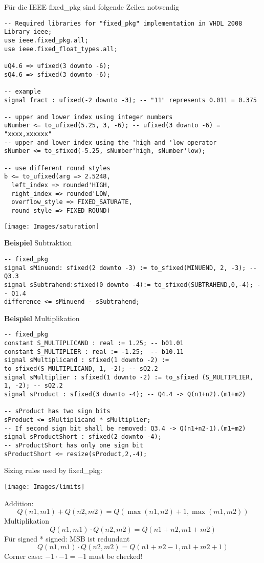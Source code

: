 Für die IEEE fixed\_pkg sind folgende Zeilen notwendig
\begin{lstlisting}
-- Required libraries for "fixed_pkg" implementation in VHDL 2008
Library ieee;
use ieee.fixed_pkg.all;
use ieee.fixed_float_types.all;

uQ4.6 => ufixed(3 downto -6);
sQ4.6 => sfixed(3 downto -6);

-- example
signal fract : ufixed(-2 downto -3); -- "11" represents 0.011 = 0.375

-- upper and lower index using integer numbers
uNumber <= to_ufixed(5.25, 3, -6); -- ufixed(3 downto -6) = "xxxx,xxxxxx"
-- upper and lower index using the 'high and 'low operator
sNumber <= to_sfixed(-5.25, sNumber'high, sNumber'low);

-- use different round styles
b <= to_ufixed(arg => 2.5248,
  left_index => rounded'HIGH,
  right_index => rounded'LOW,
  overflow_style => FIXED_SATURATE,
  round_style => FIXED_ROUND)
\end{lstlisting}


\begin{center}
	\texttt{[image: Images/saturation]}
\end{center}

\textbf{Beispiel} Subtraktion
\begin{lstlisting}
-- fixed_pkg
signal sMinuend: sfixed(2 downto -3) := to_sfixed(MINUEND, 2, -3); -- Q3.3
signal sSubtrahend:sfixed(0 downto -4):= to_sfixed(SUBTRAHEND,0,-4); -- Q1.4
difference <= sMinuend - sSubtrahend;
\end{lstlisting}

\textbf{Beispiel} Multiplikation
\begin{lstlisting}
-- fixed_pkg
constant S_MULTIPLICAND : real := 1.25; -- b01.01
constant S_MULTIPLIER : real := -1.25;  -- b10.11
signal sMultiplicand : sfixed(1 downto -2) := to_sfixed(S_MULTIPLICAND, 1, -2); -- sQ2.2
signal sMultiplier : sfixed(1 downto -2) := to_sfixed (S_MULTIPLIER, 1, -2); -- sQ2.2
signal sProduct : sfixed(3 downto -4); -- Q4.4 -> Q(n1+n2).(m1+m2)

-- sProduct has two sign bits
sProduct <= sMultiplicand * sMultiplier;
-- If second sign bit shall be removed: Q3.4 -> Q(n1+n2-1).(m1+m2)
signal sProductShort : sfixed(2 downto -4);
-- sProductShort has only one sign bit
sProductShort <= resize(sProduct,2,-4);
\end{lstlisting}


Sizing rules used by fixed\_pkg:
\begin{center}
	\texttt{[image: Images/limits]}
\end{center}

Addition:
\[
Q(n1,m1) + Q(n2,m2) = Q(\max(n1, n2) + 1, \max(m1, m2))
\]
Multiplikation
\[
Q(n1,m1) \cdot Q(n2,m2) = Q(n1 + n2, m1 + m2)
\]
Für signed * signed: MSB ist redundant
\[
Q(n1,m1) \cdot Q(n2,m2) = Q(n1 + n2 -1, m1 + m2+1)
\]
Corner case: $-1\cdot-1 = -1$ must be checked!